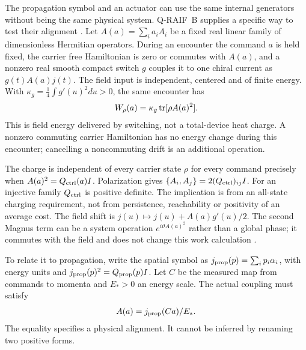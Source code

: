 The propagation symbol and an actuator can use the same internal
generators without being the same physical system. Q-RAIF~B supplies a
specific way to test their alignment \cite{Liu2026QRAIF_B}.
Let $A(a)=\sum_i a_iA_i$ be a fixed real linear family of
dimensionless Hermitian operators. During an encounter the command $a$
is held fixed, the carrier free Hamiltonian is zero or commutes with
$A(a)$, and a nonzero real smooth compact switch $g$ couples it to
one chiral current as $g(t)A(a)j(t)$. The field input is independent,
centered and of finite energy. With
$\kappa_g=\tfrac14\int g'(u)^2du>0$, the same encounter has
\begin{equation}
 W_\rho(a)=\kappa_g\operatorname{tr}[\rho A(a)^2].
 \label{eq:calibrated-work}
\end{equation}
This is field energy delivered by switching, not a total-device heat
charge. A nonzero commuting carrier Hamiltonian has no energy change
during this encounter; cancelling a noncommuting drift is an additional
operation.

The charge is independent of every carrier state $\rho$ for every
command precisely when $A(a)^2=Q_{\rm ctrl}(a)I$.
Polarization gives $\{A_i,A_j\}=2(Q_{\rm ctrl})_{ij}I$.
For an injective family $Q_{\rm ctrl}$ is positive definite.
The implication is from an all-state charging requirement, not from
persistence, reachability or positivity of an average cost.
The field shift is $j(u)\mapsto j(u)+A(a)g'(u)/2$.
The second Magnus term can be a system operation
$e^{i\vartheta A(a)^2}$ rather than a global phase; it commutes with
the field and does not change this work calculation
\cite{Liu2026QRAIF_B}.

To relate it to propagation, write the spatial symbol as
$j_{\rm prop}(p)=\sum_i p_i\alpha_i$, with energy units and
$j_{\rm prop}(p)^2=Q_{\rm prop}(p)I$.
Let $C$ be the measured map from commands to momenta and $E_*>0$
an energy scale. The actual coupling must satisfy
\[
 A(a)=j_{\rm prop}(Ca)/E_* .
\]
The equality specifies a physical alignment. It cannot be inferred by
renaming two positive forms.

